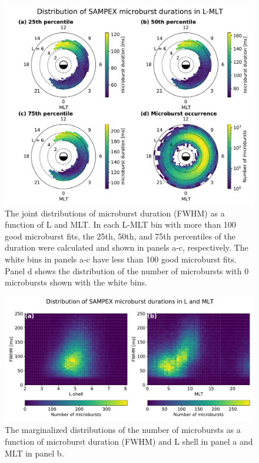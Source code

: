 \documentclass[draft]{agujournal2019}
\begin{document}
\begin{figure}
\noindent\includegraphics[width=\textwidth]{figures/fig3.pdf}
\caption{The joint distributions of microburst duration (FWHM) as a function of L and MLT. In each L-MLT bin with more than 100 good microburst fits, the 25th, 50th, and 75th percentiles of the duration were calculated and shown in panels a-c, respectively. The white bins in panels a-c have less than 100 good microburst fits. Panel d shows the distribution of the number of microbursts with 0 microbursts shown with the white bins.}
\label{fig3}
\end{figure}

\begin{figure}
\noindent\includegraphics[width=\textwidth]{figures/fig4.pdf}
\caption{The marginalized distributions of the number of microbursts as a function of microburst duration (FWHM) and L shell in panel a and MLT in panel b.}
\label{fig4}
\end{figure}
\end{document}
